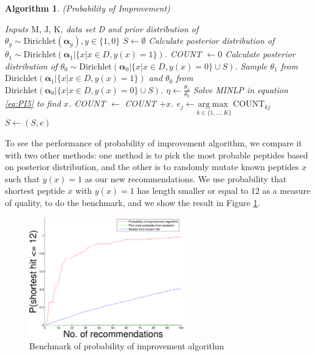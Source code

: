 \documentclass[11pt]{article}
\newtheorem{algo}{Algorithm}
\begin{document}
\begin{algo}(Probability of Improvement) \label{algo1}\\
\begin{algorithmic}[1]
\REQUIRE Inputs $\text{M, J, K}$, data set D and prior distribution of $\theta_y \sim \text{Dirichlet} (\boldsymbol \alpha_y), y \in \{1,0\}$
\STATE $S \leftarrow \emptyset $
\STATE Calculate posterior distribution of $\theta_1 \sim \text{Dirichlet} (\boldsymbol \alpha_1|\{x|x \in D,y(x)=1\})$.
\STATE COUNT $\leftarrow 0$
\STATE Calculate posterior distribution of $\theta_0 \sim \text{Dirichlet} (\boldsymbol \alpha_0|\{x|x \in D,y(x)=0\} \cup S)$.
\LOOP 
\STATE Sample $\theta_1$ from $\text{Dirichlet} (\boldsymbol \alpha_1|\{x|x \in D,y(x)=1\})$ and $\theta_0$ from $\text{Dirichlet} (\boldsymbol \alpha_0|\{x|x \in D,y(x)=0\} \cup S)$.
\STATE $\eta \leftarrow \frac{\theta_1}{\theta_0}$
\STATE Solve MINLP in equation \eqref{eq:PI5} to find $x$.
\STATE COUNT $\leftarrow$ COUNT $+ x$.
\ENDLOOP
{}
\STATE $e_j \leftarrow \underset{k \in \{1,\ldots,K\}}{\mathrm{arg}\max} \, \text{COUNT}_{kj}$
\ENDFOR
\STATE $S \leftarrow (S, e)$
\ENDFOR
\end{algorithmic}
\end{algo}
To see the performance of probability of improvement algorithm, we compare it with two other methods: one method is to pick the most probable peptides based on posterior distribution, and the other is to randomly mutate known peptides $x$ such that $y(x)=1$ as our new recommendations. We use probability that shortest peptide $x$ with $y(x)=1$ has length smaller or equal to 12 as a measure of quality, to do the benchmark, and we show the result in Figure \ref{fig:PI}.
\begin{figure}[hpt] 
\center
\includegraphics[width=0.6\textwidth]{pic/maxP_comparison.pdf}
\caption{Benchmark of probability of improvement algorithm}
\label{fig:PI}
\end{figure}
\end{document}
